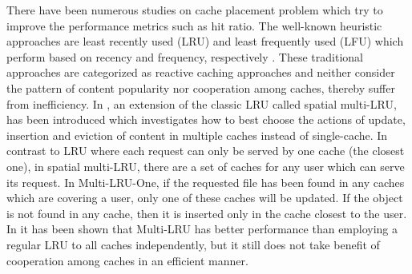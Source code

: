 \documentclass[journal,onecolumn]{IEEEtran}
\begin{document}



 

There have been numerous studies on cache placement problem which try to improve the performance metrics such as hit ratio.
The well-known heuristic approaches are least recently used (LRU)
and least frequently used (LFU) which perform based on recency and frequency, respectively \cite{ahmed2013analyzing}\cite{garetto2015efficient}. These traditional approaches are categorized as reactive caching approaches and neither consider the pattern of content popularity nor cooperation among caches, thereby suffer from inefficiency. In \cite{giovanidis2016spatial}, an extension of the classic LRU called spatial multi-LRU, has been introduced which investigates how to best choose the actions of update, insertion and eviction of content in multiple caches instead of single-cache. In contrast to LRU where each request can only be served by one cache (the closest one), in spatial multi-LRU, there are a set of caches for any user which can serve its request. In Multi-LRU-One, if the requested file has been found in any caches which are covering a user, only one of these caches will be updated. If the object is not found in any cache, then it is inserted only in the cache closest to the user. In \cite{giovanidis2016spatial} it has been shown that Multi-LRU has better performance than employing a regular LRU to all caches independently, but it still does not take benefit of cooperation among caches in an efficient manner. 
\end{document}
